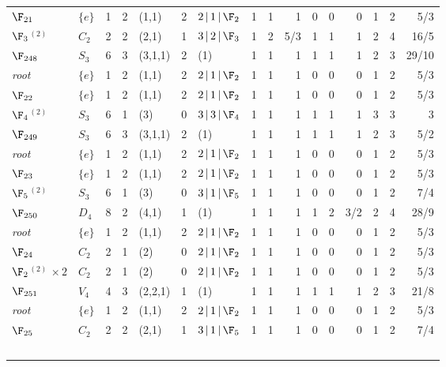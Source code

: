 \begin{landscape}
{\begin{longtable}{@{}l l r r l r l rrr rrr rrr@{}}
\quad$\F_{21}$ & $\{e\}$ & 1 & 2 & (1,1) & 2 & $2\,|\,1\,|\,\F_{2}$ & 1 & 1 & 1 & 0 & 0 & 0 & 1 & 2 & 5/3 \\
\quad$\F_{3}$$^{(2)}$ & $C_{2}$ & 2 & 2 & (2,1) & 1 & $3\,|\,2\,|\,\F_{3}$ & 1 & 2 & 5/3 & 1 & 1 & 1 & 2 & 4 & 16/5 \\
\addlinespace[3pt]
\textbf{$\F_{248}$} & $S_{3}$ & 6 & 3 & (3,1,1) & 2 & (1) & 1 & 1 & 1 & 1 & 1 & 1 & 2 & 3 & 29/10 \\
\quad\textit{root} & $\{e\}$ & 1 & 2 & (1,1) & 2 & $2\,|\,1\,|\,\F_{2}$ & 1 & 1 & 1 & 0 & 0 & 0 & 1 & 2 & 5/3 \\
\quad$\F_{22}$ & $\{e\}$ & 1 & 2 & (1,1) & 2 & $2\,|\,1\,|\,\F_{2}$ & 1 & 1 & 1 & 0 & 0 & 0 & 1 & 2 & 5/3 \\
\quad$\F_{4}$$^{(2)}$ & $S_{3}$ & 6 & 1 & (3) & 0 & $3\,|\,3\,|\,\F_{4}$ & 1 & 1 & 1 & 1 & 1 & 1 & 3 & 3 & 3 \\
\addlinespace[3pt]
\textbf{$\F_{249}$} & $S_{3}$ & 6 & 3 & (3,1,1) & 2 & (1) & 1 & 1 & 1 & 1 & 1 & 1 & 2 & 3 & 5/2 \\
\quad\textit{root} & $\{e\}$ & 1 & 2 & (1,1) & 2 & $2\,|\,1\,|\,\F_{2}$ & 1 & 1 & 1 & 0 & 0 & 0 & 1 & 2 & 5/3 \\
\quad$\F_{23}$ & $\{e\}$ & 1 & 2 & (1,1) & 2 & $2\,|\,1\,|\,\F_{2}$ & 1 & 1 & 1 & 0 & 0 & 0 & 1 & 2 & 5/3 \\
\quad$\F_{5}$$^{(2)}$ & $S_{3}$ & 6 & 1 & (3) & 0 & $3\,|\,1\,|\,\F_{5}$ & 1 & 1 & 1 & 0 & 0 & 0 & 1 & 2 & 7/4 \\
\addlinespace[3pt]
\textbf{$\F_{250}$} & $D_{4}$ & 8 & 2 & (4,1) & 1 & (1) & 1 & 1 & 1 & 1 & 2 & 3/2 & 2 & 4 & 28/9 \\
\quad\textit{root} & $\{e\}$ & 1 & 2 & (1,1) & 2 & $2\,|\,1\,|\,\F_{2}$ & 1 & 1 & 1 & 0 & 0 & 0 & 1 & 2 & 5/3 \\
\quad$\F_{24}$ & $C_{2}$ & 2 & 1 & (2) & 0 & $2\,|\,1\,|\,\F_{2}$ & 1 & 1 & 1 & 0 & 0 & 0 & 1 & 2 & 5/3 \\
\quad$\F_{2}$$^{(2)}$$\,{\times}2$ & $C_{2}$ & 2 & 1 & (2) & 0 & $2\,|\,1\,|\,\F_{2}$ & 1 & 1 & 1 & 0 & 0 & 0 & 1 & 2 & 5/3 \\
\addlinespace[3pt]
\textbf{$\F_{251}$} & $V_{4}$ & 4 & 3 & (2,2,1) & 1 & (1) & 1 & 1 & 1 & 1 & 1 & 1 & 2 & 3 & 21/8 \\
\quad\textit{root} & $\{e\}$ & 1 & 2 & (1,1) & 2 & $2\,|\,1\,|\,\F_{2}$ & 1 & 1 & 1 & 0 & 0 & 0 & 1 & 2 & 5/3 \\
\quad$\F_{25}$ & $C_{2}$ & 2 & 2 & (2,1) & 1 & $3\,|\,1\,|\,\F_{5}$ & 1 & 1 & 1 & 0 & 0 & 0 & 1 & 2 & 7/4 \\
$$
\end{longtable}}
\end{landscape}
